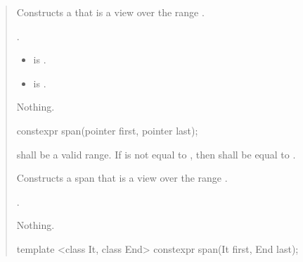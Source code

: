 \documentclass{wg21}
\begin{document}
\begin{quote}
\begin{itemdescr}
    \pnum
    \effects
    Constructs a  that is a view over the range .

    \pnum
    \ensures
    \begin{removedblock}
    	.
    \end{removedblock}
    \begin{addedblock}
    \begin{itemize}
    	\item {} is .
    	\item {} is .
    \end{itemize}
	\end{addedblock}	
    		

    \pnum
    \throws
    Nothing.

\end{itemdescr}


\begin{removedblock}
\begin{itemdecl}
constexpr span(pointer first, pointer last);
\end{itemdecl}
\end{removedblock}
\begin{removedblock}

\begin{itemdescr}
    \pnum
    \requires
     shall be a valid range.
    If  is not equal to ,
    then  shall be equal to .

    \pnum
    \effects
    Constructs a span that is a view over the range .

    \pnum
    \ensures
    .

    \pnum
    \throws
    Nothing.
\end{itemdescr}
\end{removedblock}

\begin{addedblock}
\begin{itemdecl}
template <class It, class End>
constexpr span(It first, End last);
\end{itemdecl}
\end{addedblock}


\end{quote}
\end{document}
